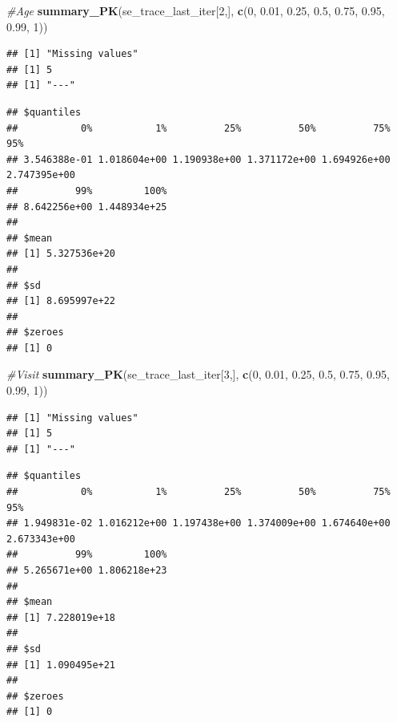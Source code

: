 \documentclass[]{article}
\newenvironment{Shaded}{\begin{snugshade}}{\end{snugshade}}
\newcommand{\CommentTok}[1]{\textcolor[rgb]{0.56,0.35,0.01}{\textit{#1}}}
\newcommand{\DecValTok}[1]{\textcolor[rgb]{0.00,0.00,0.81}{#1}}
\newcommand{\FloatTok}[1]{\textcolor[rgb]{0.00,0.00,0.81}{#1}}
\newcommand{\KeywordTok}[1]{\textcolor[rgb]{0.13,0.29,0.53}{\textbf{#1}}}
\newcommand{\NormalTok}[1]{#1}
\begin{document}
\begin{Shaded}
\begin{Highlighting}[]
\CommentTok{#Age}
\KeywordTok{summary_PK}\NormalTok{(se_trace_last_iter[}\DecValTok{2}\NormalTok{,], }\KeywordTok{c}\NormalTok{(}\DecValTok{0}\NormalTok{, }\FloatTok{0.01}\NormalTok{, }\FloatTok{0.25}\NormalTok{, }\FloatTok{0.5}\NormalTok{, }\FloatTok{0.75}\NormalTok{, }\FloatTok{0.95}\NormalTok{, }\FloatTok{0.99}\NormalTok{, }\DecValTok{1}\NormalTok{))}
\end{Highlighting}
\end{Shaded}

\begin{verbatim}
## [1] "Missing values"
## [1] 5
## [1] "---"
\end{verbatim}

\begin{verbatim}
## $quantiles
##           0%           1%          25%          50%          75%          95% 
## 3.546388e-01 1.018604e+00 1.190938e+00 1.371172e+00 1.694926e+00 2.747395e+00 
##          99%         100% 
## 8.642256e+00 1.448934e+25 
## 
## $mean
## [1] 5.327536e+20
## 
## $sd
## [1] 8.695997e+22
## 
## $zeroes
## [1] 0
\end{verbatim}

\begin{Shaded}
\begin{Highlighting}[]
\CommentTok{#Visit}
\KeywordTok{summary_PK}\NormalTok{(se_trace_last_iter[}\DecValTok{3}\NormalTok{,], }\KeywordTok{c}\NormalTok{(}\DecValTok{0}\NormalTok{, }\FloatTok{0.01}\NormalTok{, }\FloatTok{0.25}\NormalTok{, }\FloatTok{0.5}\NormalTok{, }\FloatTok{0.75}\NormalTok{, }\FloatTok{0.95}\NormalTok{, }\FloatTok{0.99}\NormalTok{, }\DecValTok{1}\NormalTok{))}
\end{Highlighting}
\end{Shaded}

\begin{verbatim}
## [1] "Missing values"
## [1] 5
## [1] "---"
\end{verbatim}

\begin{verbatim}
## $quantiles
##           0%           1%          25%          50%          75%          95% 
## 1.949831e-02 1.016212e+00 1.197438e+00 1.374009e+00 1.674640e+00 2.673343e+00 
##          99%         100% 
## 5.265671e+00 1.806218e+23 
## 
## $mean
## [1] 7.228019e+18
## 
## $sd
## [1] 1.090495e+21
## 
## $zeroes
## [1] 0
\end{verbatim}
\end{document}
